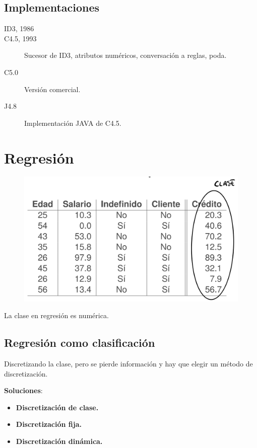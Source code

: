 \documentclass[12pt]{report} %
\begin{document}
\section{Implementaciones}

\begin{description}
	\item[ID3, 1986]
	\item[C4.5, 1993] Sucesor de ID3, atributos numéricos, conversación a reglas, poda.
	\item[C5.0] Versión comercial.
	\item[J4.8] Implementación JAVA de C4.5.
\end{description}

\chapter{Regresión}
\begin{figure}[H]
	{\includegraphics[scale=.2]{image-20210305210244509.png}}
\end{figure}
La clase en regresión es numérica.

\section{Regresión como
clasificación}

Discretizando la clase, pero se pierde información y hay que elegir un
método de discretización.

\textbf{Soluciones}:

\begin{itemize}

\item
  \textbf{Discretización de clase.}
\item
  \textbf{Discretización fija.}
\item
  \textbf{Discretización dinámica.}
\end{itemize}
\end{document}
